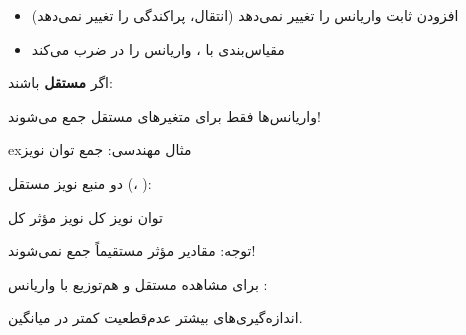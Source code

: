 


\begin{itemize}
\tightlist
\item
  افزودن ثابت  واریانس را تغییر نمی‌دهد (انتقال، پراکندگی را تغییر نمی‌دهد)
\item
  مقیاس‌بندی با ، واریانس را در  ضرب می‌کند
\end{itemize}


اگر  \textbf{مستقل} باشند:


\begin{PSquote}

\lr{\mbox{\PSwarn{}}} واریانس‌ها فقط برای متغیرهای مستقل جمع می‌شوند!

\end{PSquote}

\begin{PSbox}[unbreakable]{ex}{مثال مهندسی: جمع توان نویز}

دو منبع نویز مستقل (، ):

توان نویز کل \PSbr{}نویز مؤثر کل 

توجه: مقادیر مؤثر  مستقیماً جمع نمی‌شوند! 

\end{PSbox}


برای  مشاهده مستقل و هم‌توزیع  با واریانس :


اندازه‌گیری‌های بیشتر \lr{\mbox{\ensuremath{\to}}} عدم‌قطعیت کمتر در میانگین.



